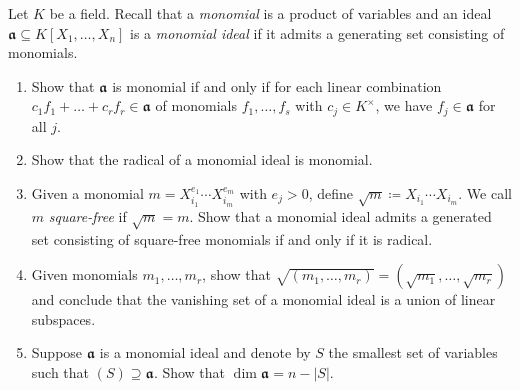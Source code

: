 \documentclass{exercises}
\begin{document}
\begin{exercise}
  Let $K$ be a field.
  Recall that a \emph{monomial} is a product of variables and an ideal $𝖆 ⊆ K[X_1,\dots,X_n]$ is a \emph{monomial ideal} if it admits a generating set consisting of monomials.
  \begin{enumerate}
    \item Show that $𝖆$ is monomial if and only if for each linear combination $c_1f_1 + \dots + c_rf_r ∈ 𝖆$ of monomials $f_1,\dots,f_s$ with $c_j ∈ K^×$, we have $f_j ∈ 𝖆$ for all $j$.
    \item Show that the radical of a monomial ideal is monomial.
    \item Given a monomial $m=X_{i_1}^{e_1}\cdots X_{i_m}^{e_m}$ with $e_j > 0$, define $\sqrt{m} \coloneqq X_{i_1}\cdots X_{i_m}$.
      We call $m$ \emph{square-free} if $\sqrt{m}=m$.
      Show that a monomial ideal admits a generated set consisting of square-free monomials if and only if it is radical.
    \item Given monomials $m_1,\dots,m_r$, show that $\sqrt{(m_1,\dots,m_r)} = (\sqrt{m_1},\dots,\sqrt{m_r})$ and conclude that the vanishing set of a monomial ideal is a union of linear subspaces.
    \item Suppose $𝖆$ is a monomial ideal and denote by $S$ the smallest set of variables such that $(S)⊇𝖆$.
      Show that $\dim 𝖆 = n - |S|$.
  \end{enumerate}
\end{exercise}
\end{document}
